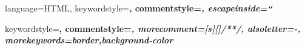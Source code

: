 {
	language=HTML,
	keywordstyle=\color{blue}\bfseries,
	commentstyle=\color{gray}\itshape,
	escapeinside=``
}

{
	keywordstyle=\color{cssKeyword}\bfseries,
	commentstyle=\color{gray}\itshape,
	morecomment=[s][\color{gray}]{/*}{*/},
	alsoletter=-,
	morekeywords={border,background-color}
}

\def\jinline{\lstinline[basicstyle=\ttfamily,keywordstyle={}, language=JAVA]}
\def\sinline{\lstinline[basicstyle=\ttfamily,keywordstyle={}, language=SQL]}
